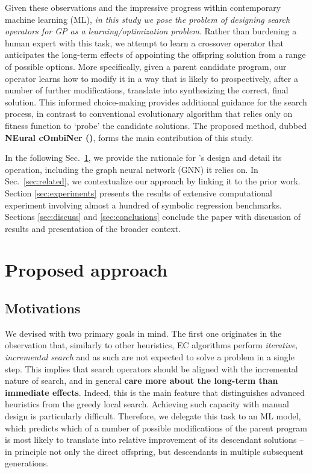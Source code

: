 Given these observations and the impressive progress within contemporary machine learning (ML), \emph{in this study we pose the problem of designing search operators for GP as a learning/optimization problem}. Rather than burdening a human expert with this task, we attempt to learn a crossover operator that anticipates the long-term effects of appointing the offspring solution from a range of possible options. More specifically, given a parent candidate program, our operator learns how to modify it in a way that is likely to prospectively, after a number of further modifications, translate into synthesizing the correct, final solution. This informed choice-making provides additional guidance for the search process, in contrast to conventional evolutionary algorithm that relies only on fitness function to `probe' the candidate solutions. The proposed method, dubbed \textbf{NEural cOmbiNer (\mname)}, forms the main contribution of this study.

In the following Sec.\ \ref{sec:approach}, we provide the rationale for \mname's design and detail its operation, including the graph neural network (GNN) it relies on. In Sec.\ \ref{sec:related}, we contextualize our approach by linking it to the prior work. Section \ref{sec:experiments} presents the results of extensive computational experiment involving almost a hundred of symbolic regression benchmarks. Sections \ref{sec:discuss} and \ref{sec:conclusions} conclude the paper with discussion of results and presentation of the broader context. 



\section{Proposed approach}\label{sec:approach}

\subsection{Motivations}\label{sec:motivations}

We devised \mname  with two primary goals in mind. The first one originates in the observation that, similarly to other heuristics, EC algorithms perform \emph{iterative, incremental search} and as such are not expected to solve a problem in a single step. This implies that search operators should be aligned with the incremental nature of search, and in general \textbf{care more about the long-term than immediate effects}. Indeed, this is the main feature that distinguishes advanced heuristics from the greedy local search. Achieving such capacity with manual design is particularly difficult. Therefore, we delegate this task to an ML model, which predicts which of a number of possible modifications of the parent program is most likely to translate into relative improvement of its descendant solutions -- in principle not only the direct offspring, but descendants in multiple subsequent generations.   

